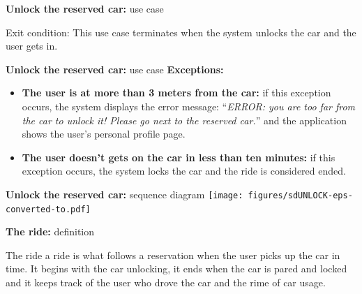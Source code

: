 \documentclass{beamer}
\begin{document}
	\begin{frame}{\textbf{Unlock the reserved car:} use case}
		\begin{block}{Exit condition:}
			This use case terminates when the system unlocks the car and the user gets in.
		\end{block}
	\end{frame}
	
	\begin{frame}{\textbf{Unlock the reserved car:} use case}
		\textbf{Exceptions:}\\
		\begin{itemize}
			\item \textbf{The user is at more than 3 meters from the car:} if this exception occurs, the system displays the error message: ``\textit{ERROR: you are too far from the car to unlock it! Please go next to the reserved car.}'' and the application shows the user's personal profile page.
			\item \textbf{The user doesn't gets on the car in less than ten minutes:} if this exception occurs, the system locks the car and the ride is considered ended.
		\end{itemize}
	\end{frame}

	\begin{frame}{\textbf{Unlock the reserved car:} sequence diagram}
		\texttt{[image: figures/sdUNLOCK-eps-converted-to.pdf]}
	\end{frame}

	\begin{frame} {\textbf{The ride:} definition}
		\begin{block}{The ride}
		a ride is what follows a reservation when the user picks up the car in time. It begins with the car unlocking, it ends when the car is pared and locked and it keeps track of the user who drove the car and the rime of car usage.
		\end{block}
	\end{frame}
\end{document}
